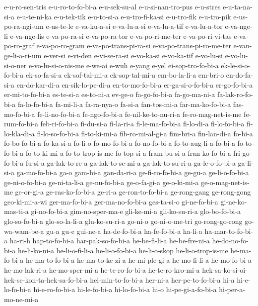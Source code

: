 {e-u-ro-sen-tris e-u-ro-to-fo-bi-a e-u-sek-su-al e-u-si-nan-tro-pus
e-u-stres e-u-ta-na-si-a e-u-te-ni-ka e-u-tek-tik e-u-to-si-a
e-u-tro-fi-ka-si e-u-tro-fik e-u-tro-pik e-us-po-ra-ngi-um e-us-te-le
e-va-ku-a-si e-va-lu-a-si e-va-lu-a-tif e-va-lu-a-tor e-va-nge-li
e-va-nge-lis e-va-po-ra-si e-va-po-ra-tor e-va-po-ri-me-ter
e-va-po-ri-vi-tas e-va-po-ro-graf e-va-po-ro-gram e-va-po-trans-pi-ra-si
e-va-po-trans-pi-ro-me-ter e-van-ge-li-a-ri-um e-ver-si e-vi-den
e-vi-se-ra-si e-vo-ka-si e-vo-ka-tif e-vo-lu-si e-vo-lu-si-o-ner
e-vo-lu-si-o-nis-me e-we-ai e-wuh e-yang e-yel ei-sop-tro-fo-bi-a
ek-le-si-o-fo-bi-a ek-so-fa-si-a ek-sof-tal-mi-a ek-sop-tal-mi-a
em-bo-la-li-a em-bri-o en-do-fa-si-a en-do-kar-di-a en-sik-lo-pe-di-a
en-to-mo-fo-bi-a er-ga-si-o-fo-bi-a er-go-fo-bi-a er-mi-to-fo-bi-a
es-te-si-a es-to-ni-a ev-ge-o fa-go-fo-bi-a fa-go-ma-ni-a
fa-lak-ro-fo-bi-a fa-lo-fo-bi-a fa-mi-li-a fa-ra-nya-o fa-si-a
fan-tos-mi-a far-ma-ko-fo-bi-a fas-mo-fo-bi-a fe-li-no-fo-bi-a
fe-ngo-fo-bi-a fe-nil-ke-to-nu-ri-a fe-ro-mag-net-is-me fe-rum-fo-bi-a
feb-ri-fo-bi-a fi-du-si-a fi-la-ri-a fi-le-ma-fo-bi-a fi-lo-di-a
fi-lo-fo-bi-a fi-lo-kla-di-a fi-lo-so-fo-bi-a fi-to-ki-mi-a
fib-ro-mi-al-gi-a fim-bri-a fin-lan-di-a fo-bi-a fo-bo-fo-bi-a fo-ka-si-a
fo-li-o fo-mo-fo-bi-a fo-no-fo-bi-a fo-to-aug-li-a-fo-bi-a fo-to-fo-bi-a
fo-to-ki-mi-a fo-to-trop-is-me fo-top-si-a fram-bu-si-a fran-ko-fo-bi-a
fri-go-fo-bi-a fu-si-a ga-lak-to-re-a ga-lak-to-se-mi-a ga-lak-to-su-ri-a
ga-le-o-fo-bi-a ga-li-si-a ga-mo-fo-bi-a ga-o gam-bi-a gan-da-ri-a
ge-fi-ro-fo-bi-a ge-gu-a ge-li-o-fo-bi-a ge-ni-o-fo-bi-a ge-ni-ta-li-a
ge-nu-fo-bi-a ge-o-fa-gi-a ge-o-ki-mi-a ge-o-mag-net-is-me ge-or-gi-a
ge-ras-ko-fo-bi-a ge-ri-a ge-ron-to-fo-bi-a ge-rong-gang ge-rong-gong
geo-ki-mi-a-wi ger-ma-fo-bi-a ger-ma-no-fo-bi-a ges-ta-si-o gi-ne-fo-bi-a
gi-ne-ko-mas-ti-a gi-no-fo-bi-a gim-no-sper-ma-e gli-ke-mi-a
gli-ko-su-ri-a glo-bo-fo-bi-a glo-so-fo-bi-a glo-so-la-li-a glu-ko-su-ri-a
go-ni-o go-ni-o-me-tri go-rong-go-rong go-wa-wam-be-a gu-a gu-e gui-ne-a
ha-de-fo-bi-a ha-fe-fo-bi-a ha-li-a ha-mar-to-fo-bi-a ha-ri-h
hap-to-fo-bi-a har-pak-so-fo-bi-a he-be-fi-li-a he-be-fre-ni-a
he-do-no-fo-bi-a he-li-ko-ni-a he-li-o-fi-li-a he-li-o-fo-bi-a
he-li-o-skop he-li-o-trop-is-me he-ma-fo-bi-a he-ma-to-fo-bi-a
he-ma-to-ke-zi-a he-mi-ple-gi-a he-mo-fi-li-a he-mo-fo-bi-a he-mo-lak-ri-a
he-mo-sper-mi-a he-te-ro-fo-bi-a he-te-ro-kro-mi-a
hek-sa-ko-si-oi-hek-se-kon-ta-hek-sa-fo-bi-a hel-min-to-fo-bi-a her-ni-a
her-pe-to-fo-bi-a hi-a hi-e-lo-fo-bi-a hi-e-ro-fo-bi-a hi-le-fo-bi-a
hi-lo-fo-bi-a hi-o hi-pe-gi-a-fo-bi-a hi-per-a-mo-ne-mi-a
}
